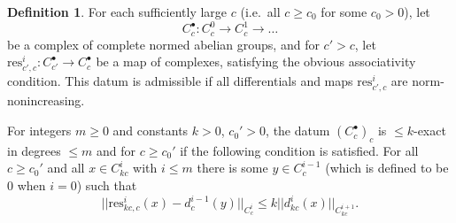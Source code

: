 \documentclass[11pt]{amsart}
\renewcommand*{\tilde}{\widetilde}
\numberwithin{equation}{section}
\numberwithin{theorem}{section}
\theoremstyle{definition}
\newtheorem{definition}[theorem]{Definition}
\begin{document}



\begin{definition} For each sufficiently large $c$ (i.e.~all $c\geq c_0$ for some $c_0>0$), let
\[
C_c^\bullet: C_c^0\to C_c^1\to\ldots
\]
be a complex of complete normed abelian groups, and for $c'>c$, let $\mathrm{res}_{c',c}^i: C_{c'}^\bullet\to C_c^\bullet$ be a map of complexes, satisfying the obvious associativity condition. This datum is admissible if all differentials and maps $\mathrm{res}_{c',c}^i$ are norm-nonincreasing.

For integers $m\geq 0$ and constants $k>0$, $c_0'>0$, the datum $(C_c^\bullet)_c$ is $\leq k$-exact in degrees $\leq m$ and for $c\geq c_0'$ if the following condition is satisfied. For all $c\geq c_0'$ and all $x\in C_{kc}^i$ with $i\leq m$ there is some $y\in C_c^{i-1}$ (which is defined to be $0$ when $i=0$) such that
\[
||\mathrm{res}_{kc,c}^i(x)-d_c^{i-1}(y)||_{C_c^i}\leq k||d_{kc}^i(x)||_{C_{kc}^{i+1}}.
\]
\end{definition}
\end{document}
